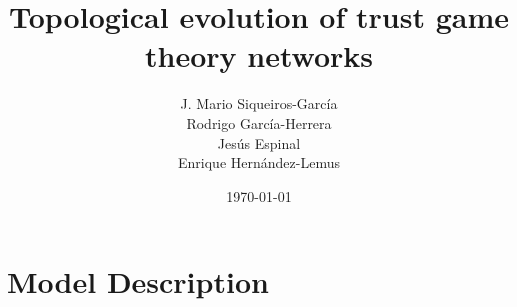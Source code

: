 \documentclass[11pt]{article}
\author{J. Mario Siqueiros-Garc\'ia\\ Rodrigo Garc\'ia-Herrera\\ Jes\'us Espinal\\ Enrique Hern\'andez-Lemus}
\title{Topological evolution of trust game theory networks}
\date{\today}
\begin{document}
\maketitle

\section{Model Description}
\end{document}
